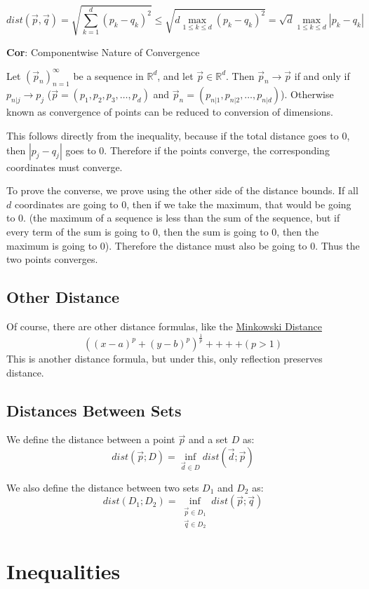 \documentclass[11 pt, twoside]{article}
\begin{document}
$$dist(\vec{p}, \vec{q}) = \sqrt{\sum_{k = 1}^d (p_k - q_k)^2} \leq \sqrt{d \max_{1 \leq k \leq d} (p_k -
q_k)^2} = \sqrt{d} \max_{1 \leq k \leq
d} |p_k - q_k|$$

\textbf{Cor}: Componentwise Nature of Convergence

Let $(\vec{p}_n)_{n = 1}^\infty$ be a sequence in $\mathbb{R}^d$, and let
$\vec{p} \in \mathbb{R}^d$. Then $\vec{p}_n \to \vec{p}$ if and only if
$p_{n|j} \to p_j$ ($\vec{p} = (p_1, p_2, p_3, \dots, p_d)$ and $\vec{p}_n =
(p_{n|1}, p_{n|2}, \dots, p_{n|d})$). Otherwise known as convergence of points
can be reduced to conversion of dimensions.

This follows directly from the inequality, because if the total distance goes to
0, then $|p_j - q_j|$ goes to 0. Therefore if the points converge, the
corresponding coordinates must converge.

To prove the converse, we prove using the other side of the distance bounds. If
all $d$ coordinates are going to 0, then if we take the maximum, that would be
going to 0. (the maximum of a sequence is less than the sum of the sequence, but
if every term of the sum is going to 0, then the sum is going to 0, then the
maximum is going to 0). Therefore the distance must also be going to 0. Thus the two points converges.

\subsection{Other Distance}
Of course, there are other distance formulas, like the \underline{Minkowski Distance}
$$((x - a)^p + (y - b)^p)^{\frac{1}{p}} ++++ (p > 1)$$
This is another distance formula, but under this, only reflection preserves
distance.

\subsection{Distances Between Sets}

We define the distance between a point $\vec{p}$ and a set $D$ as: $$dist(\vec{p}; D) = \inf_{\vec{d} \in D} dist(\vec{d} ; \vec{p})$$

We also define the distance between two sets $D_1$ and $D_2$ as: $$dist(D_1 ; D_2) = \inf_{\substack{\vec{p} \in D_1\\\vec{q} \in D_2}} dist(\vec{p} ; \vec{q})$$

\section{Inequalities}
\end{document}
